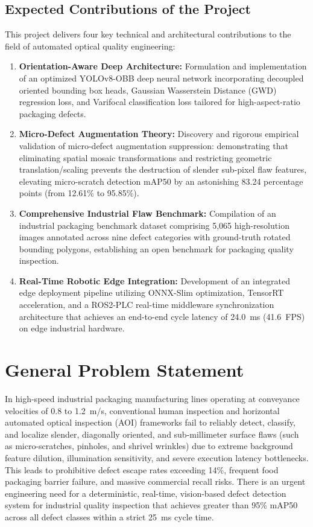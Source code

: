 \subsection{Expected Contributions of the Project}
\label{subsec:contributions}

This project delivers four key technical and architectural contributions to the field of automated optical quality engineering:

\begin{enumerate}
\item \textbf{Orientation-Aware Deep Architecture:} Formulation and implementation of an optimized YOLOv8-OBB deep neural network incorporating decoupled oriented bounding box heads, Gaussian Wasserstein Distance (GWD) regression loss, and Varifocal classification loss tailored for high-aspect-ratio packaging defects.
\item \textbf{Micro-Defect Augmentation Theory:} Discovery and rigorous empirical validation of micro-defect augmentation suppression: demonstrating that eliminating spatial mosaic transformations and restricting geometric translation/scaling prevents the destruction of slender sub-pixel flaw features, elevating micro-scratch detection mAP50 by an astonishing 83.24 percentage points (from 12.61\% to 95.85\%).
\item \textbf{Comprehensive Industrial Flaw Benchmark:} Compilation of an industrial packaging benchmark dataset comprising 5,065 high-resolution images annotated across nine defect categories with ground-truth rotated bounding polygons, establishing an open benchmark for packaging quality inspection.
\item \textbf{Real-Time Robotic Edge Integration:} Development of an integrated edge deployment pipeline utilizing ONNX-Slim optimization, TensorRT acceleration, and a ROS2-PLC real-time middleware synchronization architecture that achieves an end-to-end cycle latency of 24.0~ms (41.6~FPS) on edge industrial hardware.
\end{enumerate}

\section{General Problem Statement}
\label{sec:problem}

In high-speed industrial packaging manufacturing lines operating at conveyance velocities of 0.8 to 1.2~m/s, conventional human inspection and horizontal automated optical inspection (AOI) frameworks fail to reliably detect, classify, and localize slender, diagonally oriented, and sub-millimeter surface flaws (such as micro-scratches, pinholes, and shrivel wrinkles) due to extreme background feature dilution, illumination sensitivity, and severe execution latency bottlenecks. This leads to prohibitive defect escape rates exceeding 14\%, frequent food packaging barrier failure, and massive commercial recall risks. There is an urgent engineering need for a deterministic, real-time, vision-based defect detection system for industrial quality inspection that achieves greater than 95\% mAP50 across all defect classes within a strict 25~ms cycle time.

